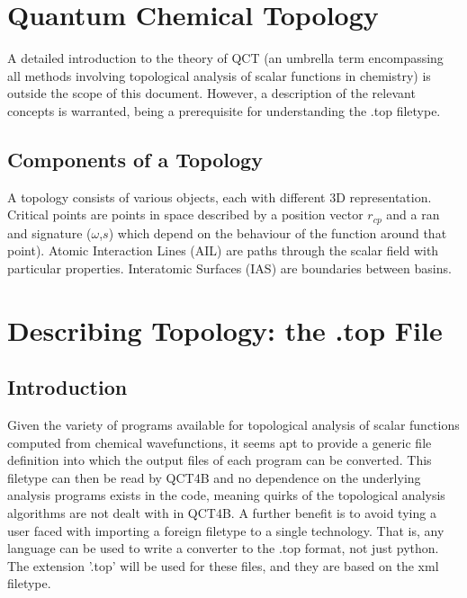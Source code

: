 \documentclass{report}
\begin{document}

\chapter{Quantum Chemical Topology}

A detailed introduction to the theory of QCT (an umbrella term encompassing all methods involving topological 
analysis of scalar functions in chemistry) is outside the scope of this document.
However, a description of the relevant concepts is warranted, being a prerequisite for understanding the .top 
filetype.

\section{Components of a Topology}

A topology consists of various objects, each with different 3D representation. 
Critical points are points in space described by a position vector $r_{cp}$ and a ran and signature ($\omega$,$s$) 
which depend on the behaviour of the function around that point).
Atomic Interaction Lines (AIL) are paths through the scalar field with particular properties.
Interatomic Surfaces (IAS) are boundaries between basins.

\chapter{Describing Topology: the .top File}

\section{Introduction}

Given the variety of programs available for topological analysis of scalar functions computed from chemical 
wavefunctions, it seems apt to provide a generic file definition into which the output files of each program 
can be converted.
This filetype can then be read by QCT4B and no dependence on the underlying analysis programs exists in the code, 
meaning quirks of the topological analysis algorithms are not dealt with in QCT4B.
A further benefit is to avoid tying a user faced with importing a foreign filetype to a single technology.
That is, any language can be used to write a converter to the .top format, not just python.
The extension '.top' will be used for these files, and they are based on the xml filetype.
\end{document}
